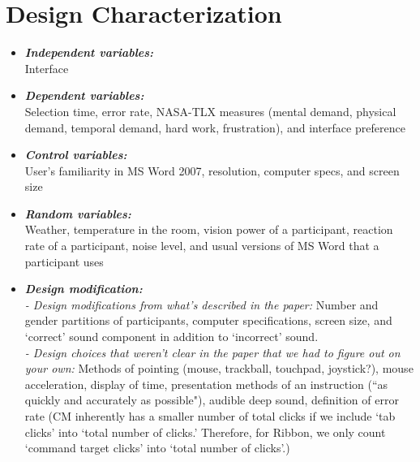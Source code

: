 \documentclass{article}
\begin{document}
\section*{Design Characterization}  
\begin{itemize}
   \item \textbf{\textit{Independent variables:}} \\
   Interface 
    \item \textbf{\textit{Dependent variables:}}\\
    Selection time, error rate, NASA-TLX measures (mental demand, physical demand, temporal demand, hard work, frustration), and interface preference 
    \item \textbf{\textit{Control variables:}} \\
   User's familiarity in MS Word 2007, resolution, computer specs, and screen size
   \item \textbf{\textit{Random variables:}} \\
   Weather, temperature in the room, vision power of a participant, reaction rate of a participant, noise level, and usual versions of MS Word that a participant uses
   \item \textbf{\textit{Design modification:}} \\
   \textit{- Design modifications from what's described in the paper:}
   Number and gender partitions of participants, computer specifications, screen size, and `correct' sound component in addition to `incorrect' sound.
   \\
   \textit{- Design choices that weren't clear in the paper that we had to figure out on your own:}
   Methods of pointing (mouse, trackball, touchpad, joystick?), mouse acceleration, display of time, presentation methods of an instruction (``as quickly and accurately as possible"), audible deep sound, definition of error rate (CM inherently has a smaller number of total clicks if we include `tab clicks' into `total number of clicks.' Therefore, for Ribbon, we only count `command target clicks' into `total number of clicks'.) 
   \end{itemize}
\end{document}
